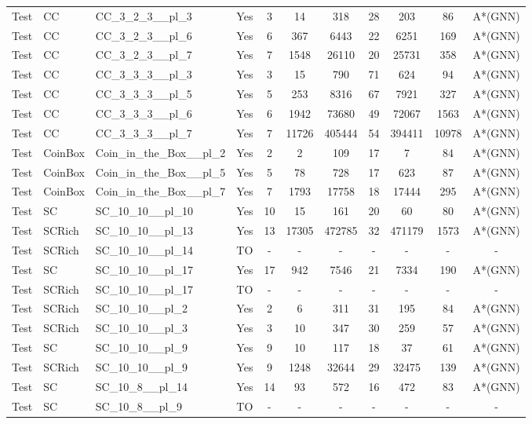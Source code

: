 \documentclass{article}
\begin{document}
\begin{tabular}{lllcccccccc}
Test & CC & CC\_3\_2\_3\_\_pl\_3 & Yes & 3 & 14 & 318 & 28 & 203 & 86 & A*(GNN) \\
Test & CC & CC\_3\_2\_3\_\_pl\_6 & Yes & 6 & 367 & 6443 & 22 & 6251 & 169 & A*(GNN) \\
Test & CC & CC\_3\_2\_3\_\_pl\_7 & Yes & 7 & 1548 & 26110 & 20 & 25731 & 358 & A*(GNN) \\
Test & CC & CC\_3\_3\_3\_\_pl\_3 & Yes & 3 & 15 & 790 & 71 & 624 & 94 & A*(GNN) \\
Test & CC & CC\_3\_3\_3\_\_pl\_5 & Yes & 5 & 253 & 8316 & 67 & 7921 & 327 & A*(GNN) \\
Test & CC & CC\_3\_3\_3\_\_pl\_6 & Yes & 6 & 1942 & 73680 & 49 & 72067 & 1563 & A*(GNN) \\
Test & CC & CC\_3\_3\_3\_\_pl\_7 & Yes & 7 & 11726 & 405444 & 54 & 394411 & 10978 & A*(GNN) \\
Test & CoinBox & Coin\_in\_the\_Box\_\_pl\_2 & Yes & 2 & 2 & 109 & 17 & 7 & 84 & A*(GNN) \\
Test & CoinBox & Coin\_in\_the\_Box\_\_pl\_5 & Yes & 5 & 78 & 728 & 17 & 623 & 87 & A*(GNN) \\
Test & CoinBox & Coin\_in\_the\_Box\_\_pl\_7 & Yes & 7 & 1793 & 17758 & 18 & 17444 & 295 & A*(GNN) \\
Test & SC & SC\_10\_10\_\_pl\_10 & Yes & 10 & 15 & 161 & 20 & 60 & 80 & A*(GNN) \\
Test & SCRich & SC\_10\_10\_\_pl\_13 & Yes & 13 & 17305 & 472785 & 32 & 471179 & 1573 & A*(GNN) \\
Test & SCRich & SC\_10\_10\_\_pl\_14 & TO & - & - & - & - & - & - & - \\
Test & SC & SC\_10\_10\_\_pl\_17 & Yes & 17 & 942 & 7546 & 21 & 7334 & 190 & A*(GNN) \\
Test & SCRich & SC\_10\_10\_\_pl\_17 & TO & - & - & - & - & - & - & - \\
Test & SCRich & SC\_10\_10\_\_pl\_2 & Yes & 2 & 6 & 311 & 31 & 195 & 84 & A*(GNN) \\
Test & SCRich & SC\_10\_10\_\_pl\_3 & Yes & 3 & 10 & 347 & 30 & 259 & 57 & A*(GNN) \\
Test & SC & SC\_10\_10\_\_pl\_9 & Yes & 9 & 10 & 117 & 18 & 37 & 61 & A*(GNN) \\
Test & SCRich & SC\_10\_10\_\_pl\_9 & Yes & 9 & 1248 & 32644 & 29 & 32475 & 139 & A*(GNN) \\
Test & SC & SC\_10\_8\_\_pl\_14 & Yes & 14 & 93 & 572 & 16 & 472 & 83 & A*(GNN) \\
Test & SC & SC\_10\_8\_\_pl\_9 & TO & - & - & - & - & - & - & - \\

\end{tabular}
\end{document}
